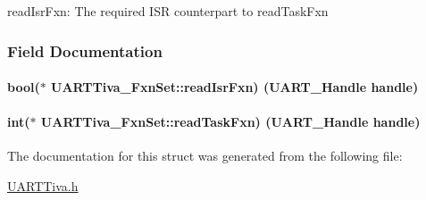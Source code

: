 read\+Isr\+Fxn\+: The required I\+S\+R counterpart to read\+Task\+Fxn 

\subsubsection{Field Documentation}
\paragraph[{read\+Isr\+Fxn}]{\setlength{\rightskip}{0pt plus 5cm}bool($\ast$ U\+A\+R\+T\+Tiva\+\_\+\+Fxn\+Set\+::read\+Isr\+Fxn) ({\bf U\+A\+R\+T\+\_\+\+Handle} handle)}\label{struct_u_a_r_t_tiva___fxn_set_ad66c0a54b44d0644b62d423d9509f00b}
\paragraph[{read\+Task\+Fxn}]{\setlength{\rightskip}{0pt plus 5cm}int($\ast$ U\+A\+R\+T\+Tiva\+\_\+\+Fxn\+Set\+::read\+Task\+Fxn) ({\bf U\+A\+R\+T\+\_\+\+Handle} handle)}\label{struct_u_a_r_t_tiva___fxn_set_a2d8d82ae7ddead58689077955772c5fa}


The documentation for this struct was generated from the following file\+:\begin{DoxyCompactItemize}
\item 
\hyperlink{_u_a_r_t_tiva_8h}{U\+A\+R\+T\+Tiva.\+h}\end{DoxyCompactItemize}
